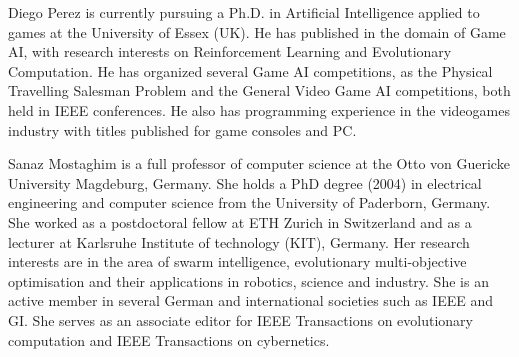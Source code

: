 \documentclass[journal]{IEEEtran}
\begin{document}
 
%


\begin{IEEEbiography}
{Diego Perez}
is currently pursuing a Ph.D. in Artificial Intelligence applied to games at the University of Essex (UK). He has published in the domain of Game AI, with research interests on Reinforcement Learning and Evolutionary Computation. He has organized several Game AI competitions, as the Physical Travelling Salesman Problem and the General Video Game AI competitions, both held in IEEE conferences. He also has programming experience in the videogames industry with titles published for game consoles and PC.
\end{IEEEbiography}


\begin{IEEEbiography}
{Sanaz Mostaghim} is a full professor of computer science at the Otto von Guericke University Magdeburg, Germany. She holds a PhD degree (2004) in electrical engineering and computer science from the University of Paderborn, Germany. She worked as a postdoctoral fellow at ETH Zurich in Switzerland and as a lecturer at Karlsruhe Institute of technology (KIT), Germany. Her research interests are in the area of swarm intelligence, evolutionary multi-objective optimisation and their applications in robotics, science and industry. She is an active member in several German and international societies such as IEEE and GI. She serves as an associate editor for IEEE Transactions on evolutionary computation and IEEE Transactions on cybernetics.
\end{IEEEbiography}
\end{document}
